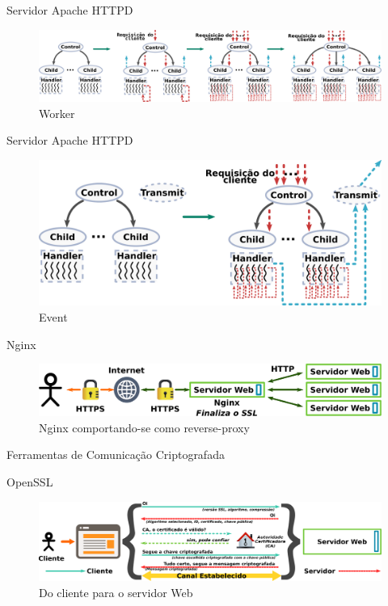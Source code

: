 \documentclass[xcolor={usenames,svgnames,dvipsnames},brazil,english,12pt,aspectratio=149]{beamer}
\begin{document}
\begin{frame}{Servidor Apache HTTPD}
  \begin{figure}[!h]
    \centering
    \includegraphics[width=\textwidth]{worker} 
    \caption*{Worker}
  \end{figure}
\end{frame}

\begin{frame}{Servidor Apache HTTPD}
  \begin{figure}[!h]
    \centering
    \includegraphics[width=\textwidth]{event} 
    \caption*{Event}
  \end{figure}
\end{frame}

\begin{frame}{Nginx}
  \begin{figure}[!h]
    \centering
    \includegraphics[width=\textwidth]{nginx_load_balancer_ex} 
    \caption*{Nginx comportando-se como reverse-proxy}
  \end{figure}
\end{frame}

\begin{frame}{Ferramentas de Comunicação Criptografada}
\end{frame}

\begin{frame}{OpenSSL}
  \begin{figure}[!h]
    \centering
    \includegraphics[width=\textwidth]{ssl_handshake}
    \caption*{Do cliente para o servidor Web}
  \end{figure}
\end{frame}
\end{document}
